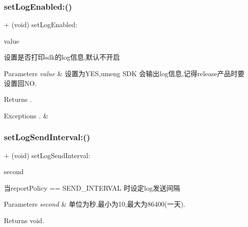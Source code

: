 \subsubsection{\texorpdfstring{set\+Log\+Enabled\+:()}{setLogEnabled:()}}
{\footnotesize\ttfamily + (void) set\+Log\+Enabled\+: \begin{DoxyParamCaption}\item[{(B\+O\+OL)}]{value }\end{DoxyParamCaption}}

设置是否打印sdk的log信息,默认不开启 
\begin{DoxyParams}{Parameters}
{\em value} & 设置为\+Y\+ES,umeng S\+DK 会输出log信息,记得release产品时要设置回\+NO. \\
\hline
\end{DoxyParams}
\begin{DoxyReturn}{Returns}
. 
\end{DoxyReturn}

\begin{DoxyExceptions}{Exceptions}
{\em .} & \\
\hline
\end{DoxyExceptions}
\mbox{\label{interfaceMobClick_a713f1465c188481da6ce858594300590}} 
\subsubsection{\texorpdfstring{set\+Log\+Send\+Interval\+:()}{setLogSendInterval:()}}
{\footnotesize\ttfamily + (void) set\+Log\+Send\+Interval\+: \begin{DoxyParamCaption}\item[{(double)}]{second }\end{DoxyParamCaption}}

当report\+Policy == S\+E\+N\+D\+\_\+\+I\+N\+T\+E\+R\+V\+AL 时设定log发送间隔


\begin{DoxyParams}{Parameters}
{\em second} & 单位为秒,最小为10,最大为86400(一天). \\
\hline
\end{DoxyParams}
\begin{DoxyReturn}{Returns}
void. 
\end{DoxyReturn}
\mbox{\label{interfaceMobClick_a315c097059ad7c61bd0deb945c5b8c8f}} 
